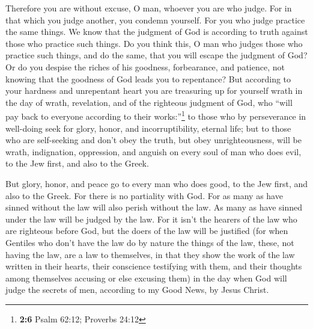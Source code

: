  Therefore you are without excuse, O man, whoever you are
who judge. For in that which you judge another, you condemn yourself.
For you who judge practice the same things.  We know that
the judgment of God is according to truth against those who practice
such things.  Do you think this, O man who judges those
who practice such things, and do the same, that you will escape the
judgment of God?  Or do you despise the riches of his
goodness, forbearance, and patience, not knowing that the goodness of
God leads you to repentance?  But according to your
hardness and unrepentant heart you are treasuring up for yourself wrath
in the day of wrath, revelation, and of the righteous judgment of God,
 who ``will pay back to everyone according to their
works:''\footnote{\textbf{2:6} Psalm 62:12; Proverbs 24:12}
 to those who by perseverance in well-doing seek for
glory, honor, and incorruptibility, eternal life;  but to
those who are self-seeking and don't obey the truth, but obey
unrighteousness, will be wrath, indignation,  oppression,
and anguish on every soul of man who does evil, to the Jew first, and
also to the Greek.

 But glory, honor, and peace go to every man who does
good, to the Jew first, and also to the Greek.  For there
is no partiality with God.  For as many as have sinned
without the law will also perish without the law. As many as have sinned
under the law will be judged by the law.  For it isn't
the hearers of the law who are righteous before God, but the doers of
the law will be justified  (for when Gentiles who don't
have the law do by nature the things of the law, these, not having the
law, are a law to themselves,  in that they show the work
of the law written in their hearts, their conscience testifying with
them, and their thoughts among themselves accusing or else excusing
them)  in the day when God will judge the secrets of men,
according to my Good News, by Jesus Christ.

